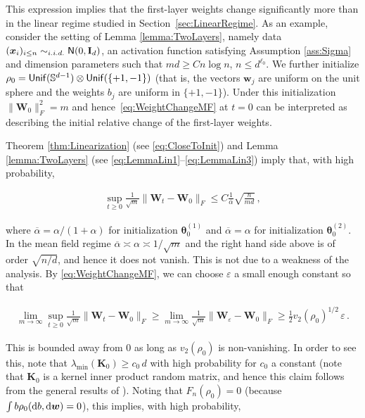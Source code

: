   This expression implies that the first-layer weights change significantly more than in the linear  regime studied in
  Section~\ref{sec:LinearRegime}.
  As an example, consider the setting of Lemma \ref{lemma:TwoLayers}, namely data $({\boldsymbol x}_i)_{i\le n}\sim_{i.i.d.}{\sf N}(0,{\mathbf I}_d)$, an activation function satisfying Assumption \ref{ass:Sigma} and dimension parameters such that $md\ge C n\log n$, $n\le d^{\ell_0}$.
  We further initialize $\rho_0={\sf Unif}({\mathbb S}^{d-1})\otimes {\sf Unif}(\{+1,-1\})$ (that is, the vectors ${\boldsymbol w}_j$ are uniform on the unit sphere and the weights $b_j$ are uniform in $\{+1,-1\}$). Under this initialization $\|{\boldsymbol W}_0\|_F^2=m$ and hence~\eqref{eq:WeightChangeMF}
  at $t=0$ can be interpreted as describing the initial relative change of the first-layer weights.

 Theorem \ref{thm:Linearization} (see \eqref{eq:CloseToInit}) and Lemma \ref{lemma:TwoLayers}
  (see \eqref{eq:LemmaLin1}--\eqref{eq:LemmaLin3})
  imply that, with high probability,

  \begin{align}
    \sup_{t\ge 0}\frac{1}{\sqrt{m}}\|{\boldsymbol W}_t-{\boldsymbol W}_0\|_F \le C \frac{1}{\overline{\alpha}}\sqrt{\frac{n}{md}}\, ,\label{eq:UpperBoundInitialMov}
  \end{align}

  where $\overline{\alpha} = \alpha/(1+\alpha)$ for initialization ${\boldsymbol \theta}^{(1)}_0$ and  $\overline{\alpha} = \alpha$ for initialization ${\boldsymbol \theta}^{(2)}_0$.
   In the mean field regime $\overline{\alpha} \asymp \alpha \asymp 1/\sqrt{m}$ and  the right hand side above is of order
   $\sqrt{n/d}$, and hence it does not vanish. This is not due to a weakness of the analysis. By \eqref{eq:WeightChangeMF}, we can choose $\varepsilon$ a small enough constant so that

  \begin{align}
    \lim_{m\to\infty} \sup_{t\ge 0}\frac{1}{\sqrt{m}}\|{\boldsymbol W}_t-{\boldsymbol W}_0\|_F \ge \lim_{m\to\infty} \frac{1}{\sqrt{m}}\|{\boldsymbol W}_\varepsilon-{\boldsymbol W}_0\|_F \ge
    \frac{1}{2}v_2(\rho_0)^{1/2}\, \varepsilon\, .\label{eq:WeightMovement}
  \end{align}

  This is bounded away from $0$ as long as $v_2(\rho_0)$ is non-vanishing. In order to see this, note that $\lambda_{\min}({\boldsymbol K}_0)\ge c_0\, d$ with high probability   for $c_0$ a   constant (note that ${\boldsymbol K}_0$ is a kernel inner product random matrix, and hence this claim follows from the general results of \cite{mei2020generalization}). Noting that $F_n(\rho_0) = 0$ (because $\int b \rho_0({\rm d} b,{\rm d}{\boldsymbol w})=0$), this implies, with high probability, 

